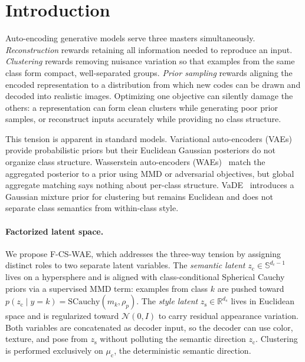 \documentclass[10pt]{article}
\newcommand{\ours}{F-CS-WAE}
\newcommand{\zc}{z_{\mathrm{c}}}
\newcommand{\zs}{z_{\mathrm{s}}}
\newcommand{\muc}{\mu_{\mathrm{c}}}
\newcommand{\Sph}{\mathbb{S}}
\newcommand{\R}{\mathbb{R}}
\newcommand{\SCauchy}{\mathrm{SCauchy}}
\begin{document}
\section{Introduction}

Auto-encoding generative models serve three masters simultaneously.
\emph{Reconstruction} rewards retaining all information needed to reproduce an input.
\emph{Clustering} rewards removing nuisance variation so that examples from the same
class form compact, well-separated groups.
\emph{Prior sampling} rewards aligning the encoded representation to a distribution
from which new codes can be drawn and decoded into realistic images.
Optimizing one objective can silently damage the others: a representation can form
clean clusters while generating poor prior samples, or reconstruct inputs accurately
while providing no class structure.

This tension is apparent in standard models.
Variational auto-encoders (VAEs)~\citep{kingma2013autoencoding} provide probabilistic
priors but their Euclidean Gaussian posteriors do not organize class structure.
Wasserstein auto-encoders (WAEs)~\citep{tolstikhin2017wasserstein} match the
aggregated posterior to a prior using MMD or adversarial objectives, but global
aggregate matching says nothing about per-class structure.
VaDE~\citep{jiang2016variational} introduces a Gaussian mixture prior for clustering
but remains Euclidean and does not separate class semantics from within-class style.

\paragraph{Factorized latent space.}
We propose \ours, which addresses the three-way tension by assigning distinct roles
to two separate latent variables.
The \emph{semantic latent} $\zc\in\Sph^{d_c-1}$ lives on a hypersphere and is
aligned with class-conditional Spherical Cauchy priors via a supervised MMD term:
examples from class $k$ are pushed toward $p(\zc\mid y{=}k)=\SCauchy(m_k,\rho_p)$.
The \emph{style latent} $\zs\in\R^{d_s}$ lives in Euclidean space and is regularized
toward $\mathcal{N}(0,I)$ to carry residual appearance variation.
Both variables are concatenated as decoder input, so the decoder can use color,
texture, and pose from $\zs$ without polluting the semantic direction $\zc$.
Clustering is performed exclusively on $\muc$, the deterministic semantic direction.
\end{document}
